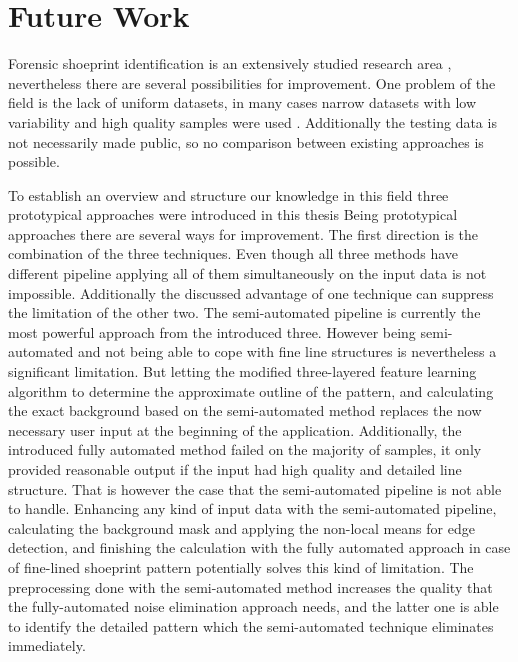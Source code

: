 \documentclass[draft,final]{vutinfth} %
\begin{document}
\chapter{Future Work}
\par
Forensic shoeprint identification is an extensively studied research area \cite{rida2019forensic}, nevertheless there are several possibilities for improvement.
One problem of the field is the lack of uniform datasets, in many cases narrow datasets with low variability and high quality samples were used  \cite{rida2019forensic}.
Additionally the testing data is not necessarily made public, so no comparison between existing approaches is possible.
\par
To establish an overview and structure our knowledge in this field three prototypical approaches were introduced in this thesis
Being prototypical approaches there are several ways for improvement.
The first direction is the combination of the three techniques.
Even though all three methods have different pipeline applying all of them simultaneously on the input data is not impossible.
Additionally the discussed advantage of one technique can suppress the limitation of the other two.
The semi-automated pipeline is currently the most powerful approach from the introduced three.
However being semi-automated and not being able to cope with fine line structures is nevertheless a significant limitation.
But letting the modified three-layered feature learning algorithm to determine the approximate outline of the pattern, and calculating the exact background based on the semi-automated method replaces the now necessary user input at the beginning of the application.
Additionally, the introduced fully automated method failed on the majority of samples, it only provided reasonable output if the input had high quality and detailed line structure.
That is however the case that the semi-automated pipeline is not able to handle.
Enhancing any kind of input data with the semi-automated pipeline, calculating the background mask and applying the non-local means for edge detection, and finishing the calculation with the fully automated approach in case of fine-lined shoeprint pattern potentially solves this kind of limitation.
The preprocessing done with the semi-automated method increases the quality that the fully-automated noise elimination approach needs, and the latter one is able to identify the detailed pattern which the semi-automated technique eliminates immediately.
\par
\end{document}
